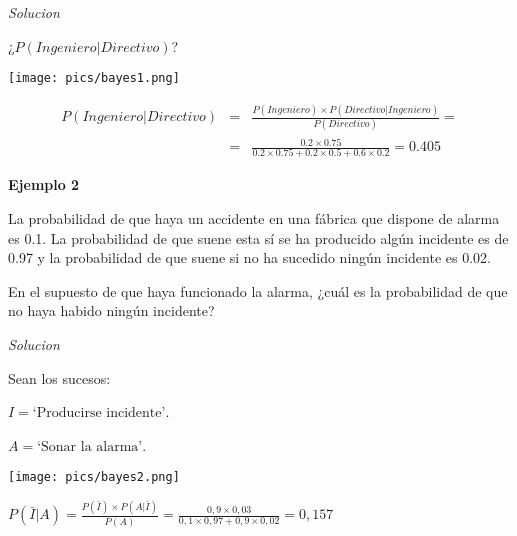 \documentclass[]{article}
\numberwithin{equation}{section}
\begin{document}
\emph{Solucion}

¿\(P(Ingeniero|Directivo)\)?

\texttt{[image: pics/bayes1.png]}

\begin{eqnarray*}
P(Ingeniero|Directivo) & = & \frac{P(Ingeniero) \times P(Directivo|Ingeniero)}{P(Directivo)} = \\ 
& = & \frac{0.2\times 0.75}{0.2 \times 0.75 + 0.2 \times 0.5 + 0.6 \times 0.2} = 0.405
\end{eqnarray*}

\textbf{Ejemplo 2}

La probabilidad de que haya un accidente en una fábrica que dispone de
alarma es 0.1. La probabilidad de que suene esta sí se ha producido
algún incidente es de 0.97 y la probabilidad de que suene si no ha
sucedido ningún incidente es 0.02.

En el supuesto de que haya funcionado la alarma, ¿cuál es la
probabilidad de que no haya habido ningún incidente?

\emph{Solucion}

Sean los sucesos:

\(I = \mbox{`Producirse incidente'}\).

\(A = \mbox{`Sonar la alarma'}\).

\texttt{[image: pics/bayes2.png]}

\(P(\bar{I}|A) = \frac{P(\bar{I}) \times P(A|\bar{I})}{P(A)} = \frac{0,9\times 0,03}{0,1\times 0,97 + 0,9 \times 0,02}=0,157\)
\end{document}
